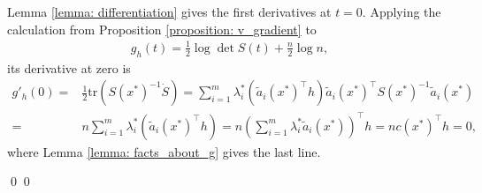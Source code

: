 \documentclass[smallextended]{svjour3}
\let\springerproof\proof
\let\endspringerproof\endproof
\renewenvironment{proof}{\springerproof}{%
  \ifhmode\qed\else\leavevmode\qed\fi\endspringerproof}
\newcommand{\tr}{\mathrm{tr}}
\begin{document}
\begin{proof}
    Lemma \ref{lemma: differentiation} gives the first derivatives at $t=0$.
    Applying the calculation from Proposition \ref{proposition: v_gradient} to
    \begin{align}\label{eq: g_h_in_t}
        g_h(t) = \frac{1}{2}\log \det S(t) + \frac{n}{2} \log n,
    \end{align}
    its derivative at zero is
    \begin{align*}
        g'_h(0) = & \frac{1}{2}\tr(S(x^*)^{-1}\dot{S})
        = \sum_{i=1}^m \lambda_i^* (\tilde{a}_i(x^*)^\top h)\tilde{a}_i(x^*) ^\top S(x^*)^{-1}\tilde{a}_i(x^*) \\
        = & n\sum_{i=1}^m \lambda_i^* (\tilde{a}_i(x^*)^\top h) =  n \left(\sum_{i=1}^m \lambda_i^* \tilde{a}_i(x^*)\right)^\top h = n c(x^*)^\top h =0,
    \end{align*}
    where Lemma \ref{lemma: facts_about_g} gives the last line.


\end{proof}
\end{document}
